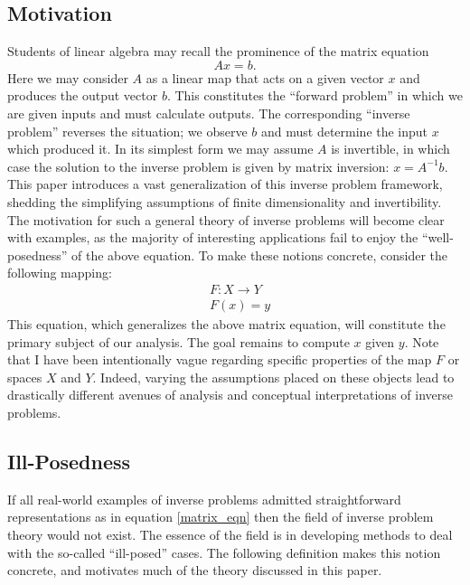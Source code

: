\documentclass[12pt]{article}
\begin{document}
\subsection{Motivation}
Students of linear algebra may recall the prominence of the matrix equation
\begin{equation} 
Ax = b. \label{matrix_eqn}
\end{equation}  
Here we may consider $A$ as a linear map 
that acts on a given vector $x$ and produces the output vector $b$. 
This constitutes the ``forward problem'' in which we are given inputs and must 
calculate outputs. The corresponding ``inverse problem'' reverses the situation; we observe 
$b$ and must determine the input $x$ which produced it. In its simplest form we may assume 
$A$ is invertible, in which case the solution to the inverse problem is given by matrix 
inversion: $x = A^{-1}b$. This paper introduces a vast generalization of this inverse 
problem framework, shedding the simplifying assumptions of finite dimensionality
and invertibility. The motivation for such a general theory 
of inverse problems will become clear with examples, as the majority of interesting 
applications fail to enjoy the ``well-posedness'' of the above equation. 
To make these notions concrete, consider the following mapping:
\begin{eqnarray} 
&F: X \to Y \\
&F(x) = y \label{inverse_problem}
\end{eqnarray} 
This equation, which generalizes the above matrix equation, will constitute the primary subject 
of our analysis. The goal remains to compute $x$ given $y$. Note that I have been intentionally 
vague regarding specific properties of the map $F$ or spaces $X$ and $Y$. Indeed, varying the assumptions 
placed on these objects lead to drastically different avenues of analysis and conceptual interpretations
of inverse problems. 

\subsection{Ill-Posedness}

If all real-world examples of inverse problems admitted straightforward representations as in equation \eqref{matrix_eqn}
then the field of inverse problem theory would not exist. The essence of the field is in developing methods to 
deal with the so-called ``ill-posed'' cases. The following definition makes this notion concrete, 
and motivates much of the theory discussed in this paper. 
\end{document}
